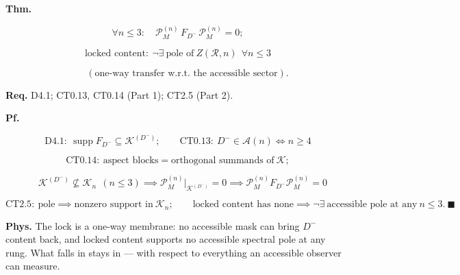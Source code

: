 \begin{theorem}\label{tag:CT4-2}
\textbf{Thm.}

\[
\forall n\le3:\quad\mathcal P_M^{(n)}\,F_{D^-}\,\mathcal P_M^{(n)}=0;
\]

\[
\text{locked content}:\ \neg\exists\ \text{pole of}\ Z(\mathcal R,n)\ \ \forall n\le3
\]

\[
\qquad (\text{one-way transfer w.r.t. the accessible sector}).
\]

\textbf{Req.} D4.1; CT0.13, CT0.14 (Part 1); CT2.5 (Part 2).

\textbf{Pf.}

\[
\mathrm{D4.1}:\ \operatorname{supp}F_{D^-}\subseteq\mathcal K^{(D^-)};\qquad
\mathrm{CT0.13}:\ D^-\in\mathcal A(n)\iff n\ge4
\]

\[
\mathrm{CT0.14}:\ \text{aspect blocks}=\text{orthogonal summands of}\ \mathcal K;
\]

\[
\quad \mathcal K^{(D^-)}\not\subseteq\mathcal K_n\ \ (n\le3)\implies\mathcal P_M^{(n)}\big|_{\mathcal K^{(D^-)}}=0\implies\mathcal P_M^{(n)}F_{D^-}\mathcal P_M^{(n)}=0
\]

\[
\mathrm{CT2.5}:\ \text{pole}\implies\text{nonzero support in}\ \mathcal K_n;\qquad
\text{locked content has none}\implies\neg\exists\ \text{accessible pole at any}\ n\le3.\ \blacksquare
\]

\textbf{Phys.} The lock is a one-way membrane: no accessible mask can bring $D^-$ content back, and locked content supports no accessible spectral pole at any rung. What falls in stays in — with respect to everything an accessible observer can measure.

\end{theorem}

